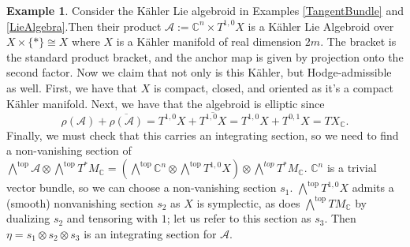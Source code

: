 \documentclass{amsart}
\newcommand{\C}{\mathbb{C}}
\theoremstyle{definition}
\newcommand{\A}{\mathcal{A}}
\theoremstyle{definition}
\newtheorem{exmp}[theorem]{Example}
\begin{document}
\begin{exmp}
    Consider the Kähler Lie algebroid in Examples \ref{TangentBundle} and \ref{LieAlgebra}.Then their product $\A :=\C^n \times T^{1,0}X $ is a Kähler Lie Algebroid over $X \times \{*\} \cong X$ where $X$ is a Kähler manifold of real dimension $2m$. The bracket is the standard product bracket, and the anchor map is given by projection onto the second factor. Now we claim that not only is this Kähler, but Hodge-admissible as well. First, we have that $X$ is compact, closed, and oriented as it's a compact Kähler manifold. Next, we have that the algebroid is elliptic since
    \begin{equation*}
        \rho(\A) + \overline{\rho(\A)} = T^{1,0}X+\overline{T^{1,0}X} =T^{1,0}X+T^{0,1}X= TX_\C.
    \end{equation*}
    Finally, we must check that this carries an integrating section, so we need to find a non-vanishing section of $\bigwedge^{\text{top}}\A \otimes \bigwedge^{\text{top}}T^*M_\C= (\bigwedge^{\text{top}}\C^n \otimes \bigwedge^{\text{top}}T^{1,0}X)\otimes \bigwedge^{top}T^*M_\C$. $\C^n$ is a trivial vector bundle, so we can choose a non-vanishing section $s_1$. $\bigwedge^\text{top}T^{1,0}X$ admits a (smooth) nonvanishing section $s_2$ as $X$ is symplectic, as does $\bigwedge^\text{top}TM_\C$ by dualizing $s_2$ and tensoring with $1$; let us refer to this section as $s_3$. Then $\eta = s_1 \otimes s_2 \otimes s_3$ is an integrating section for $\A$.
    
\end{exmp}
\end{document}
